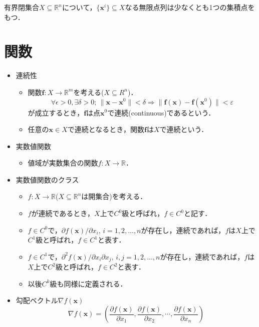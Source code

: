 \documentclass{jsreport}
\begin{document}
有界閉集合$X \subseteq \mathbb{R}^n$について，$\{\bm{x}^i\} \subseteq X$なる無限点列は少なくとも1つの集積点をもつ．

\section{関数}
\begin{itemize}
  \item 連続性
  \begin{itemize}
    \item 関数$\bm{f}: X \rightarrow \mathbb{R}^m$を考える($X \subseteq R^n$)．
    \begin{equation}
      \forall \epsilon > 0, \exists \delta > 0; \, \|\bm{x} - \bm{x}^0\| < \delta \Rightarrow \|\bm{f}(\bm{x}) - \bm{f}(\bm{x}^0) \| < \varepsilon \nonumber
    \end{equation}
    が成立するとき，$\bm{f}$は点$\bm{x}^0$で連続(continuous)であるという．
    \item 任意の$\bm{x} \in X$で連続となるとき，関数$\bm{f}$は$X$で連続という．
  \end{itemize}
  \item 実数値関数
  \begin{itemize}
    \item 値域が実数集合の関数$f: X \rightarrow \mathbb{R}$．
  \end{itemize}
  \item 実数値関数のクラス
  \begin{itemize}
    \item $f: X \rightarrow \mathbb{R}$($X \subseteq \mathbb{R}^n$は開集合)を考える．
    \item $f$が連続であるとき，$X$上で$C^0$級と呼ばれ，$f \in C^0$と記す．
    \item $f \in C^0$で，$\partial f(\bm{x}) / \partial x_i, \, i = 1, 2, \ldots, n$が存在し，連続であれば，$f$は$X$上で$C^1$級と呼ばれ，$f \in C^1$と表す．
    \item $f \in C^1$で，$\partial^2 f(\bm{x}) / \partial x_i \partial x_j, \, i,j = 1, 2, \ldots, n$が存在し，連続であれば，$f$は$X$上で$C^2$級と呼ばれ，$f \in C^2$と表す．
    \item 以後$C^k$級も同様に定義される．
  \end{itemize}
  \item 勾配ベクトル$\nabla f(\bm{x})$
    \begin{equation}
      \nabla f(\bm{x}) = \left(\frac{\partial f(\bm{x})}{\partial x_1}, \frac{\partial f(\bm{x})}{\partial x_2}, \cdots, \frac{\partial f(\bm{x})}{\partial x_n}\right) \nonumber

\end{equation}
\end{itemize}
\end{document}
